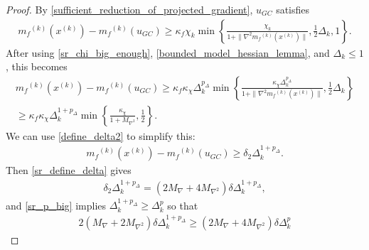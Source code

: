 \documentclass{article}
\theoremstyle{case}
\numberwithin{theorem}{subsection}
\newcommand{\dk}{\Delta_k}
\newcommand{\maxgrad}{{M_{\nabla}}}
\newcommand{\maxhessian}{{M_{\nabla^2}}}
\newcommand{\mfk}{{{m}_f}^{(k)}}
\newcommand{\xk}{x^{(k)}}
\begin{document}
\begin{proof}
By \cref{sufficient_reduction_of_projected_gradient}, $u_{GC}$ satisfies
\begin{align*}
\mfk(\xk) - \mfk(u_{GC}) \ge \kappa_f \chi_k \min\left\{ \frac{\chi_k}{1+\|\nabla^2 \mfk(\xk)\|}, \frac 1 2 \dk, 1 \right\}.
\end{align*}
After using \cref{sr_chi_big_enough}, \cref{bounded_model_hessian_lemma}, and $\dk \le 1$, this becomes
\begin{align*}
\mfk(\xk) - \mfk(u_{GC})
\ge \kappa_f \kappa_{\chi} \dk^{p_{\Delta}} \min\left\{ \frac{\kappa_{\chi} \dk^{p_{\Delta}}}{1+\|\nabla^2 \mfk(\xk)\|}, \frac 1 2 \dk \right\} \\
\ge \kappa_f \kappa_{\chi} \dk^{1 + p_{\Delta}} \min\left\{ \frac{\kappa_{\chi}}{1 + \maxhessian}, \frac 1 2  \right\}.
\end{align*}
We can use \cref{define_delta2} to simplify this:
\begin{align*}
\mfk(\xk) - \mfk(u_{GC}) \ge \delta_2 \dk^{1 + p_{\Delta}}.
\end{align*}
Then \cref{sr_define_delta} gives
\begin{align*}
\delta_2 \dk^{1 + p_{\Delta}} = \left(2\maxgrad + 4\maxhessian\right)\delta\dk^{1 + p_{\Delta}},
\end{align*}
and \cref{sr_p_big} implies $\dk^{1+p_{\Delta}} \ge \dk^p$ so that
\begin{align*}
2\left(\maxgrad + 2\maxhessian\right)\delta\dk^{1 + p_{\Delta}}
\ge \left(2\maxgrad + 4\maxhessian\right)\delta\dk^{p}
\end{align*}



\end{proof}
\end{document}
